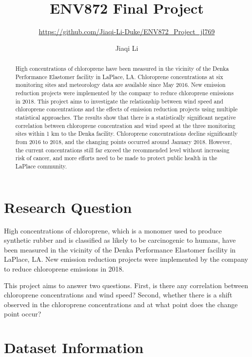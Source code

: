\documentclass[12pt,]{article}
\title{ENV872 Final Project}
\subtitle{\url{https://github.com/Jiaqi-Li-Duke/ENV872_Project_jl769}}
\author{Jiaqi Li}
\date{}
\begin{document}
\maketitle
\begin{abstract}
High concentrations of chloroprene have been measured in the vicinity of
the Denka Performance Elastomer facility in LaPlace, LA. Chloroprene
concentrations at six monitoring sites and meteorology data are
available since May 2016. New emission reduction projects were
implemented by the company to reduce chloroprene emissions in 2018. This
project aims to investigate the relationship between wind speed and
chloroprene concentrations and the effects of emission reduction
projects using multiple statistical approaches. The results show that
there is a statistically significant negative correlation between
chloroprene concentration and wind speed at the three monitoring sites
within 1 km to the Denka facility. Chloroprene concentrations decline
significantly from 2016 to 2018, and the changing points occurred around
January 2018. However, the current concentrations still far exceed the
recommended level without increasing risk of cancer, and more efforts
need to be made to protect public health in the LaPlace community.
\end{abstract}

\newpage

\tableofcontents  \newpage
\listoftables  \newpage
\listoffigures  \newpage

\section{Research Question}\label{research-question}

High concentrations of chloroprene, which is a monomer used to produce
synthetic rubber and is classified as likely to be carcinogenic to
humans, have been measured in the vicinity of the Denka Performance
Elastomer facility in LaPlace, LA. New emission reduction projects were
implemented by the company to reduce chloroprene emissions in 2018.

This project aims to answer two questions. First, is there any
correlation between chloroprene concentrations and wind speed? Second,
whether there is a shift observed in the chloroprene concentrations and
at what point does the change point occur?

\newpage

\section{Dataset Information}\label{dataset-information}
\end{document}
